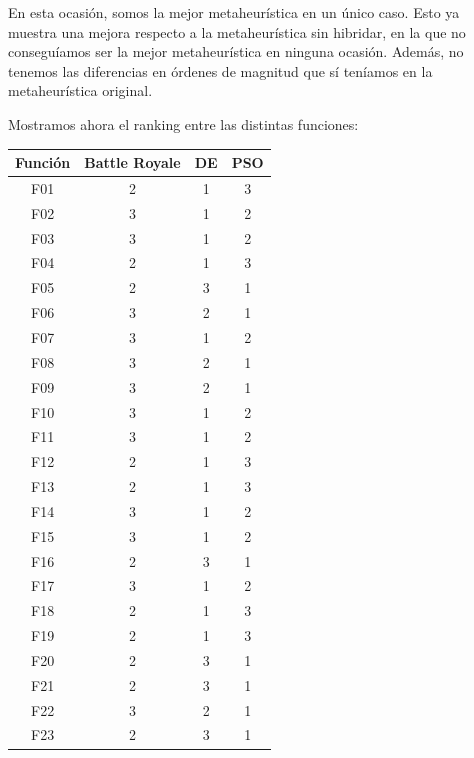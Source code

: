 \documentclass[11pt]{article}
\begin{document}
En esta ocasión, somos la mejor metaheurística en un único caso. Esto ya muestra una mejora respecto a la metaheurística sin hibridar, en la que no conseguíamos ser la mejor metaheurística en ninguna ocasión. Además, no tenemos las diferencias en órdenes de magnitud que sí teníamos en la metaheurística original.

Mostramos ahora el ranking entre las distintas funciones:

\begin{table}[H]
\centering
\begin{tabular}{|c|c|c|c|}
\hline
\textbf{Función} & \textbf{Battle Royale} &         \textbf{DE} &        \textbf{PSO} \\
\hline
F01  &             2 &      1 &      3 \\
F02  &             3 &      1 &      2 \\
F03  &             3 &      1 &      2 \\
F04  &             2 &      1 &      3 \\
F05  &             2 &      3 &      1 \\
F06  &             3 &      2 &      1 \\
F07  &             3 &      1 &      2 \\
F08  &             3 &      2 &      1 \\
F09  &             3 &      2 &      1 \\
F10  &             3 &      1 &      2 \\
F11  &             3 &      1 &      2 \\
F12  &             2 &      1 &      3 \\
F13  &             2 &      1 &      3 \\
F14  &             3 &      1 &      2 \\
F15  &             3 &      1 &      2 \\
F16  &             2 &      3 &      1 \\
F17  &             3 &      1 &      2 \\
F18  &             2 &      1 &      3 \\
F19  &             2 &      1 &      3 \\
F20  &             2 &      3 &      1 \\
F21  &             2 &      3 &      1 \\
F22  &             3 &      2 &      1 \\
F23  &             2 &      3 &      1 \\

\end{tabular}
\end{table}
\end{document}
